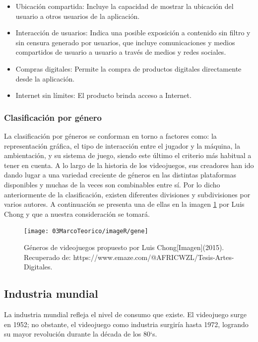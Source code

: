 			
			\begin{itemize}
			
			\item Ubicación compartida: Incluye la capacidad de mostrar la ubicación del usuario a otros usuarios de la aplicación.
			\item Interacción de usuarios: Indica una posible exposición a contenido sin filtro y sin censura generado por usuarios, que incluye comunicaciones y medios compartidos de usuario a usuario a través de medios y redes sociales.
			\item Compras digitales: Permite la compra de productos digitales directamente desde la aplicación.
			\item Internet sin límites: El producto brinda acceso a Internet.
		\end{itemize}
		
	\subsubsection{Clasificación por género}
 La clasificación por géneros se conforman en torno a factores como: la representación gráfica, el tipo de interacción entre el jugador y la máquina, la ambientación, y su sistema de juego, siendo este último el criterio más habitual a tener en cuenta. A lo largo de la historia de los videojuegos, sus creadores han ido dando lugar a una variedad creciente de géneros en las distintas plataformas disponibles y muchas de la veces son combinables entre sí. Por lo dicho anteriormente de la clasificación, existen diferentes divisiones y subdivisiones por varios autores. A continuación se presenta una de ellas en la imagen \ref{fig:vidGen} por Luis Chong y que a nuestra consideración se tomará.
	\\[1pt]
	
	\begin{figure}
		\centering
		\texttt{[image: 03MarcoTeorico/imageR/gene]}
		\caption{Géneros de videojuegos propuesto por Luis Chong[Imagen](2015). Recuperado de: https://www.emaze.com/@AFRICWZL/Tesis-Artes-Digitales.}
		\label{fig:vidGen}
	\end{figure}	
	
		
\subsection{Industria mundial}
			 
			 La industria mundial refleja el nivel de consumo que existe. El videojuego surge en 1952; no obstante, el videojuego como industria surgiría hasta 1972, logrando su mayor revolución durante la década de los 80`s. 
			 \\[1pt]
			 

